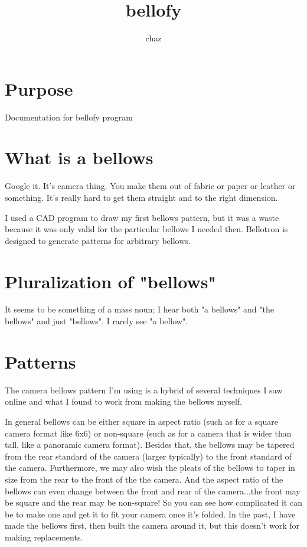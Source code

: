 \documentclass[dvips,12pt]{article}
\title{bellofy}
\author{chaz}
\begin{document}
\frenchspacing

\section{Purpose}
Documentation for bellofy program

\tableofcontents
\listoffigures


\section{What is a bellows}

Google it. It's camera thing. You make them out of fabric or paper or 
leather or something. It's really hard to get them straight and to the 
right dimension. 

I used a CAD program to draw my first bellows pattern, but it was a waste
because it was only valid for the particular bellows I needed then. Bellotron
is designed to generate patterns for arbitrary bellows. 

\section{Pluralization of "bellows"}

It seems to be something of a mass noun; I hear both "a bellows" and 
"the bellows" and just "bellows". I rarely see "a bellow".

\section{Patterns}

The camera bellows pattern I'm using is a hybrid of several techniques
I saw online and what I found to work from making the bellows myself.

In general bellows can be either square in aspect ratio (such as for a square
camera format like 6x6) or non-square (such as for a camera that is wider 
than tall, like a panoramic camera format). Besides that, the bellows may
be tapered from the rear standard of the camera (larger typically) to the
front standard of the camera. Furthermore, we may also wish the pleats 
of the bellows to taper in size from the rear
to the front of the the camera. And the aspect ratio of the bellows can 
even change between the front and rear of the camera...the front may be
square and the rear may be non-square! So you can see how complicated 
it can be to make one and get
it to fit your camera once it's folded. In the past, I have made the 
bellows first, then built the camera around it, but this doesn't work
for making replacements. 
\end{document}
